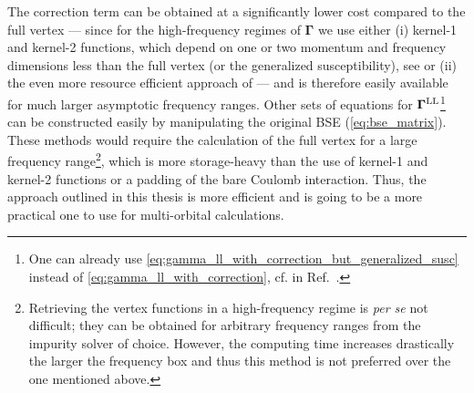 \documentclass[../../main.tex]{subfiles}
\begin{document}
The correction term can be obtained at a significantly lower cost compared to the full vertex --- since for the high-frequency regimes of $\bm\Gamma$ we use either (i) kernel-1 and kernel-2 functions, which depend on one or two momentum and frequency dimensions less than the full vertex (or the generalized susceptibility), see  or (ii) the even more resource efficient  approach of  --- and is therefore easily available for much larger asymptotic frequency ranges. Other sets of equations for $\bm\Gamma^{\text{L}\text{L}}$\footnote{One can already use \eqref{eq:gamma_ll_with_correction_but_generalized_susc} instead of \eqref{eq:gamma_ll_with_correction}, cf.  in Ref.~\cite{Tagliavini2018}.} can be constructed easily by manipulating the original BSE (\ref{eq:bse_matrix}). These methods would require the calculation of the full vertex for a large frequency range\footnote{Retrieving the vertex functions in a high-frequency regime is \textit{per se} not difficult; they can be obtained for arbitrary frequency ranges from the impurity solver of choice. However, the computing time increases drastically the larger the frequency box and thus this method is not preferred over the one mentioned above.}, which is more storage-heavy than the use of kernel-1 and kernel-2 functions or a padding of the bare Coulomb interaction. Thus, the approach outlined in this thesis is more efficient and is going to be a more practical one to use for multi-orbital calculations.
%  	
\end{document}
